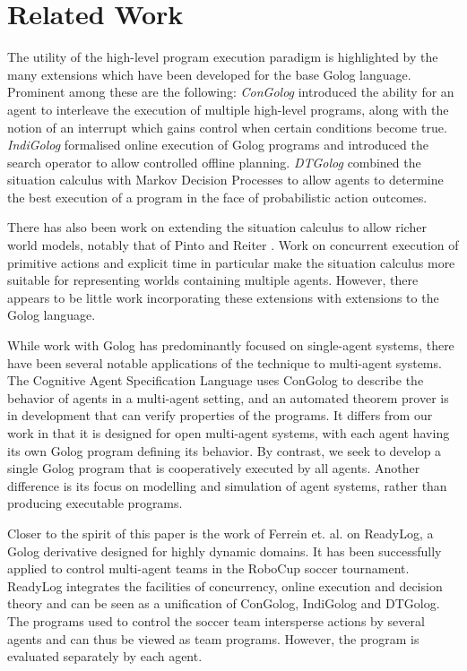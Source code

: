 \documentclass[letterpaper]{article}
\begin{document}
\section{Related Work}

\label{sec:Other-Work}

The utility of the high-level program execution paradigm is highlighted
by the many extensions which have been developed for the base Golog
language. Prominent among these are the following: \emph{ConGolog}
\cite{giacomo00congolog} introduced the ability for an agent to interleave
the execution of multiple high-level programs, along with the notion
of an interrupt which gains control when certain conditions become
true. \emph{IndiGolog} \cite{giacomo99indigolog} formalised online
execution of Golog programs and introduced the search operator to
allow controlled offline planning. \emph{DTGolog} \cite{boutilier00dtgolog}
combined the situation calculus with Markov Decision Processes to
allow agents to determine the best execution of a program in the face
of probabilistic action outcomes.

There has also been work on extending the situation calculus to allow
richer world models, notably that of Pinto \cite{pinto94temporal}
and Reiter \cite{reiter96sc_nat_conc}. Work on concurrent execution
of primitive actions and explicit time in particular make the situation
calculus more suitable for representing worlds containing multiple
agents. However, there appears to be little work incorporating these
extensions with extensions to the Golog language.

While work with Golog has predominantly focused on single-agent systems,
there have been several notable applications of the technique to multi-agent
systems. The Cognitive Agent Specification Language \cite{shapiro02}
uses ConGolog to describe the behavior of agents in a multi-agent
setting, and an automated theorem prover is in development that can
verify properties of the programs. It differs from our work in that
it is designed for open multi-agent systems, with each agent having
its own Golog program defining its behavior. By contrast, we seek
to develop a single Golog program that is cooperatively executed by
all agents. Another difference is its focus on modelling and simulation
of agent systems, rather than producing executable programs.

Closer to the spirit of this paper is the work of Ferrein et. al.
\cite{Ferrein2005readylog} on ReadyLog, a Golog derivative designed
for highly dynamic domains. It has been successfully applied to control
multi-agent teams in the RoboCup soccer tournament. ReadyLog integrates
the facilities of concurrency, online execution and decision theory
and can be seen as a unification of ConGolog, IndiGolog and DTGolog.
The programs used to control the soccer team intersperse actions by
several agents and can thus be viewed as team programs. However, the
program is evaluated separately by each agent.
\end{document}
